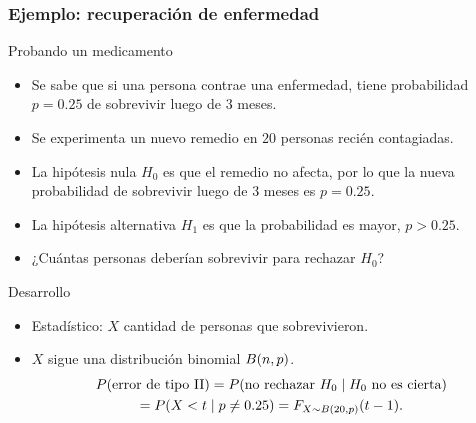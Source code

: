 \documentclass[table]{beamer}
\begin{document}
\begin{frame}
    \frametitle{Ejemplo: recuperación de enfermedad}
    \begin{exampleblock}{Probando un medicamento}
        \begin{itemize}
            \item Se sabe que si una persona contrae una enfermedad, tiene probabilidad $p = 0.25$ de sobrevivir luego de $3$ meses.
            \item Se experimenta un nuevo remedio en $20$ personas recién contagiadas.
            \item La hipótesis nula $H_{0}$ es que el remedio no afecta, por lo que la nueva probabilidad de sobrevivir luego de $3$ meses es $p = 0.25$.
            \item La hipótesis alternativa $H_{1}$ es que la probabilidad es mayor, $p > 0.25$.
            \item ¿Cuántas personas deberían sobrevivir para rechazar $H_{0}$?
        \end{itemize}
    \end{exampleblock}

\end{frame}

\begin{frame}
    \begin{block}{Desarrollo}
        \begin{itemize}
            \item Estadístico: $X$ cantidad de personas que sobrevivieron.
            \item $X$ sigue una distribución binomial $\binomial{n}{p}$.
                \begin{multline*}
                    \prob{\text{error de tipo II}} = \prob{\text{no rechazar } H_{0} \mid H_{0} \text{ no es cierta}}
                    \\
                    = \prob{X < t \mid p \neq 0.25}
                    = \pFF{X \sim \binomial{20}{p}}{t - 1} .
                \end{multline*}
        \end{itemize}
    \end{block}
\end{frame}
\end{document}
